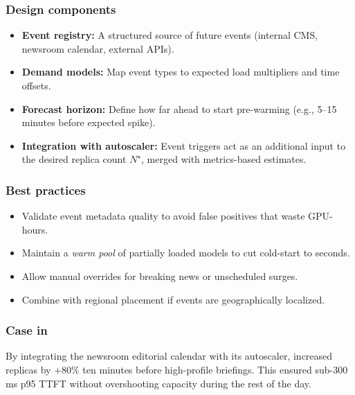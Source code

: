 \subsubsection{Design components}
\begin{itemize}
    \item \textbf{Event registry:} A structured source of future events (internal CMS, newsroom calendar, external APIs).
    \item \textbf{Demand models:} Map event types to expected load multipliers and time offsets.
    \item \textbf{Forecast horizon:} Define how far ahead to start pre-warming (e.g., 5--15 minutes before expected spike).
    \item \textbf{Integration with autoscaler:} Event triggers act as an additional input to the desired replica count $N^\star$, merged with metrics-based estimates.
\end{itemize}

\subsubsection{Best practices}
\begin{itemize}
    \item Validate event metadata quality to avoid false positives that waste GPU-hours.
    \item Maintain a \emph{warm pool} of partially loaded models to cut cold-start to seconds.
    \item Allow manual overrides for breaking news or unscheduled surges.
    \item Combine with regional placement if events are geographically localized.
\end{itemize}

\subsubsection{Case in \ishtar{}}
By integrating the newsroom editorial calendar with its autoscaler, \ishtar{} increased replicas by $+80\%$ ten minutes before high-profile briefings. This ensured sub-300\,ms p95 TTFT without overshooting capacity during the rest of the day.

